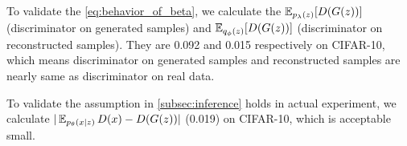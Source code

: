To validate the \cref{eq:behavior_of_beta}, we calculate the $\operatorname{\mathbb{E}}_{p_\lambda(z)}[ D(G(z))]$ (discriminator on generated samples) and $\operatorname{\mathbb{E}}_{q_\phi(z)}[ D(G(z))]$ (discriminator on reconstructed samples). They are 0.092 and 0.015 respectively on CIFAR-10, which means discriminator on generated samples and reconstructed samples are nearly same as discriminator on real data. 

To validate the assumption in \cref{subsec:inference} holds in actual experiment, we calculate $|\operatorname{\mathbb{E}}_{p_\theta(x|z)}D(x) - D(G(z))|$ (0.019) on CIFAR-10, which is acceptable small. 





